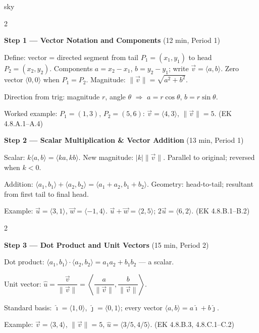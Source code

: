 \documentclass[10pt]{article}
\begin{document}
\begin{skillbox}{sky}
\begin{multicols}{2}

\textbf{Step 1 --- Vector Notation and Components} (12 min, Period 1)

Define: vector = directed segment from tail $P_1=(x_1,y_1)$ to head
$P_2=(x_2,y_2)$. Components $a=x_2-x_1$, $b=y_2-y_1$; write
$\vec{v}=\langle a,b\rangle$. Zero vector $\langle 0,0\rangle$ when
$P_1=P_2$. Magnitude: $\|\vec{v}\|=\sqrt{a^2+b^2}$.

Direction from trig: magnitude $r$, angle $\theta$ $\Rightarrow$
$a=r\cos\theta$, $b=r\sin\theta$.

Worked example: $P_1=(1,3)$, $P_2=(5,6)$:
$\vec{v}=\langle 4,3\rangle$, $\|\vec{v}\|=5$. (EK 4.8.A.1--A.4)

\columnbreak

\textbf{Step 2 --- Scalar Multiplication \& Vector Addition} (13 min, Period 1)

Scalar: $k\langle a,b\rangle=\langle ka,kb\rangle$. New magnitude: $|k|\|\vec{v}\|$.
Parallel to original; reversed when $k<0$.

Addition: $\langle a_1,b_1\rangle+\langle a_2,b_2\rangle
=\langle a_1+a_2,b_1+b_2\rangle$.
Geometry: head-to-tail; resultant from first tail to final head.

Example: $\vec{u}=\langle 3,1\rangle$, $\vec{w}=\langle -1,4\rangle$.
$\vec{u}+\vec{w}=\langle 2,5\rangle$; $2\vec{u}=\langle 6,2\rangle$.
(EK 4.8.B.1--B.2)

\end{multicols}

\begin{multicols}{2}

\textbf{Step 3 --- Dot Product and Unit Vectors} (15 min, Period 2)

Dot product: $\langle a_1,b_1\rangle\cdot\langle a_2,b_2\rangle
=a_1 a_2+b_1 b_2$ --- a scalar.

Unit vector: $\hat{u}=\dfrac{\vec{v}}{\|\vec{v}\|}
=\left\langle\dfrac{a}{\|\vec{v}\|},\dfrac{b}{\|\vec{v}\|}\right\rangle$.

Standard basis: $\hat{\imath}=\langle 1,0\rangle$, $\hat{\jmath}=\langle 0,1\rangle$;
every vector $\langle a,b\rangle=a\hat{\imath}+b\hat{\jmath}$.

Example: $\vec{v}=\langle 3,4\rangle$, $\|\vec{v}\|=5$,
$\hat{u}=\langle 3/5,4/5\rangle$. (EK 4.8.B.3, 4.8.C.1--C.2)


\end{multicols}
\end{skillbox}
\end{document}
